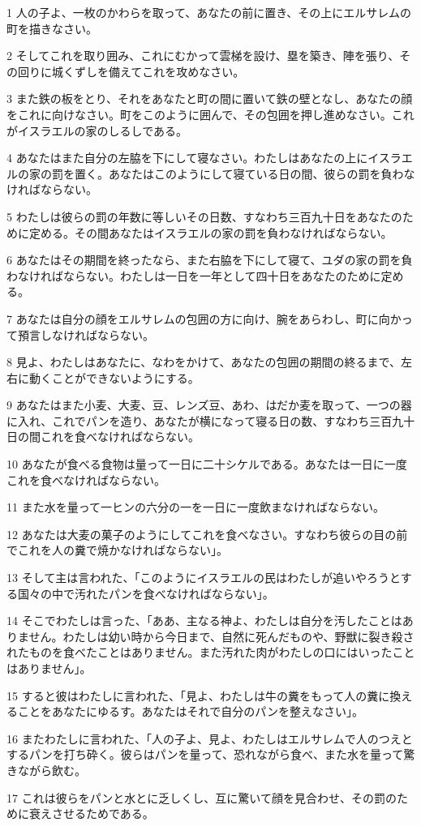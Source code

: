 \par 1 人の子よ、一枚のかわらを取って、あなたの前に置き、その上にエルサレムの町を描きなさい。
\par 2 そしてこれを取り囲み、これにむかって雲梯を設け、塁を築き、陣を張り、その回りに城くずしを備えてこれを攻めなさい。
\par 3 また鉄の板をとり、それをあなたと町の間に置いて鉄の壁となし、あなたの顔をこれに向けなさい。町をこのように囲んで、その包囲を押し進めなさい。これがイスラエルの家のしるしである。
\par 4 あなたはまた自分の左脇を下にして寝なさい。わたしはあなたの上にイスラエルの家の罰を置く。あなたはこのようにして寝ている日の間、彼らの罰を負わなければならない。
\par 5 わたしは彼らの罰の年数に等しいその日数、すなわち三百九十日をあなたのために定める。その間あなたはイスラエルの家の罰を負わなければならない。
\par 6 あなたはその期間を終ったなら、また右脇を下にして寝て、ユダの家の罰を負わなければならない。わたしは一日を一年として四十日をあなたのために定める。
\par 7 あなたは自分の顔をエルサレムの包囲の方に向け、腕をあらわし、町に向かって預言しなければならない。
\par 8 見よ、わたしはあなたに、なわをかけて、あなたの包囲の期間の終るまで、左右に動くことができないようにする。
\par 9 あなたはまた小麦、大麦、豆、レンズ豆、あわ、はだか麦を取って、一つの器に入れ、これでパンを造り、あなたが横になって寝る日の数、すなわち三百九十日の間これを食べなければならない。
\par 10 あなたが食べる食物は量って一日に二十シケルである。あなたは一日に一度これを食べなければならない。
\par 11 また水を量って一ヒンの六分の一を一日に一度飲まなければならない。
\par 12 あなたは大麦の菓子のようにしてこれを食べなさい。すなわち彼らの目の前でこれを人の糞で焼かなければならない」。
\par 13 そして主は言われた、「このようにイスラエルの民はわたしが追いやろうとする国々の中で汚れたパンを食べなければならない」。
\par 14 そこでわたしは言った、「ああ、主なる神よ、わたしは自分を汚したことはありません。わたしは幼い時から今日まで、自然に死んだものや、野獣に裂き殺されたものを食べたことはありません。また汚れた肉がわたしの口にはいったことはありません」。
\par 15 すると彼はわたしに言われた、「見よ、わたしは牛の糞をもって人の糞に換えることをあなたにゆるす。あなたはそれで自分のパンを整えなさい」。
\par 16 またわたしに言われた、「人の子よ、見よ、わたしはエルサレムで人のつえとするパンを打ち砕く。彼らはパンを量って、恐れながら食べ、また水を量って驚きながら飲む。
\par 17 これは彼らをパンと水とに乏しくし、互に驚いて顔を見合わせ、その罰のために衰えさせるためである。

